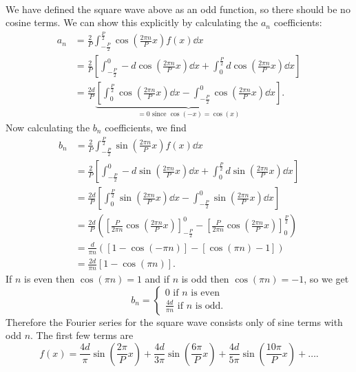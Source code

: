 \documentclass[../classical_mechanics.tex]{subfiles}
\begin{document}
\begin{example}
            \paragraph{}
            We have defined the square wave above as an odd function, so there should be no cosine terms.
            We can show this explicitly by calculating the $a_n$ coefficients:
            \begin{align}
                a_n&=\frac{2}{P}\int_{-\frac{P}{2}}^{\frac{P}{2}}\cos\left(\frac{2\pi n}{P}x\right)f(x)\dd{x}\\
                &=\frac{2}{P}\left[\int_{-\frac{P}{2}}^0 -d\cos\left(\frac{2\pi n}{P}x\right)\dd{x}+\int_0^{\frac{P}{2}}d\cos\left(\frac{2\pi n}{P}x\right)\dd{x}\right]\\
                &=\frac{2d}{P}\underbrace{\left[\int_0^{\frac{P}{2}}\cos\left(\frac{2\pi n}{P}x\right)\dd{x}-\int_{-\frac{P}{2}}^0\cos\left(\frac{2\pi n}{P}x\right)\dd{x}\right]}_{=0\text{ since }\cos(-x)=\cos(x)}.
            \end{align}
            Now calculating the $b_n$ coefficients, we find
            \begin{align}
                b_n&=\frac{2}{P}\int_{-\frac{P}{2}}^{\frac{P}{2}}\sin\left(\frac{2\pi n}{P}x\right)f(x)\dd{x}\\
                &=\frac{2}{P}\left[\int_{-\frac{P}{2}}^0 -d\sin\left(\frac{2\pi n}{P}x\right)\dd{x}+\int_0^{\frac{P}{2}}d\sin\left(\frac{2\pi n}{P}x\right)\dd{x}\right]\\
                &=\frac{2d}{P}\left[\int_0^{\frac{P}{2}}\sin\left(\frac{2\pi n}{P}x\right)\dd{x}-\int_{-\frac{P}{2}}^0\sin\left(\frac{2\pi n}{P}x\right)\dd{x}\right]\\
                &=\frac{2d}{P}\left(\left[\frac{P}{2\pi n}\cos\left(\frac{2\pi n}{P}x\right)\right]_{-\frac{P}{2}}^0-\left[\frac{P}{2\pi n}\cos\left(\frac{2\pi n}{P}x\right)\right]_0^{\frac{P}{2}}\right)\\
                &=\frac{d}{\pi n}([1-\cos(-\pi n)]-[\cos(\pi n)-1])\\
                &=\frac{2d}{\pi n}[1-\cos(\pi n)].
            \end{align}
            If $n$ is even then $\cos(\pi n)=1$ and if $n$ is odd then $\cos(\pi n)=-1$, so we get
            \begin{equation}
                b_n=\begin{cases}
                    0\text{ if $n$ is even}\\
                    \frac{4d}{\pi n}\text{ if $n$ is odd.}
                \end{cases}
            \end{equation}
            Therefore the Fourier series for the square wave consists only of sine terms with odd $n$.
            The first few terms are
            \begin{equation}
                f(x)=\frac{4d}{\pi}\sin\left(\frac{2\pi}{P}x\right)+\frac{4d}{3\pi}\sin\left(\frac{6\pi}{P}x\right)+\frac{4d}{5\pi}\sin\left(\frac{10\pi}{P}x\right)+\dots.
            \end{equation}
        \end{example}
\end{document}
